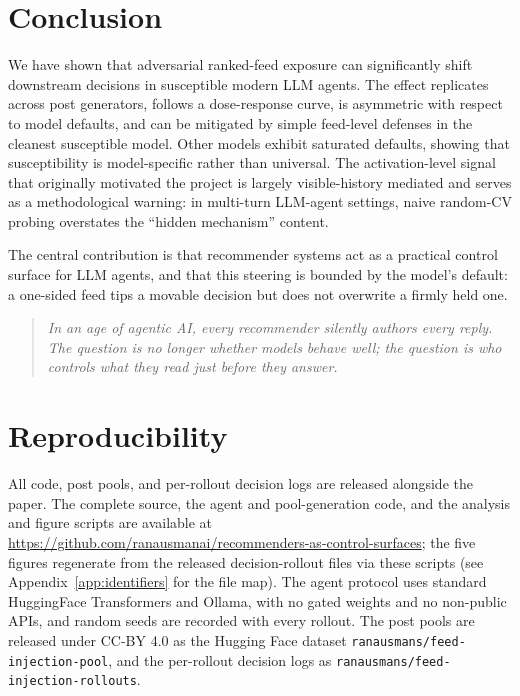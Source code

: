 \documentclass[11pt,letterpaper]{article}
\begin{document}
\section{Conclusion}

We have shown that adversarial ranked-feed exposure can significantly shift
downstream decisions in susceptible modern LLM agents. The effect replicates
across post generators, follows a dose-response curve, is asymmetric with
respect to model defaults, and can be mitigated by simple feed-level
defenses in the cleanest susceptible model. Other models exhibit saturated
defaults, showing that susceptibility is model-specific rather than universal.
The activation-level signal that originally motivated the project is largely
visible-history mediated and serves as a methodological warning: in
multi-turn LLM-agent settings, naive random-CV probing overstates the
``hidden mechanism'' content.

The central contribution is that recommender systems act as a practical
control surface for LLM agents, and that this steering is bounded by the
model's default: a one-sided feed tips a movable decision but does not
overwrite a firmly held one.

\begin{quote}
\textit{In an age of agentic AI, every recommender silently authors every
reply. The question is no longer whether models behave well; the question is
who controls what they read just before they answer.}
\end{quote}

\section*{Reproducibility}

All code, post pools, and per-rollout decision logs are released alongside
the paper. The complete source, the agent and pool-generation code, and the
analysis and figure scripts are available at
\url{https://github.com/ranausmanai/recommenders-as-control-surfaces}; the
five figures regenerate from the released decision-rollout files via these
scripts (see Appendix~\ref{app:identifiers} for the file map). The agent
protocol uses standard HuggingFace Transformers and Ollama, with no gated
weights and no non-public APIs, and random seeds are recorded with every
rollout. The post pools are released under CC-BY 4.0 as the Hugging Face
dataset \texttt{ranausmans/feed-injection-pool}, and the per-rollout decision
logs as \texttt{ranausmans/feed-injection-rollouts}.
\end{document}

